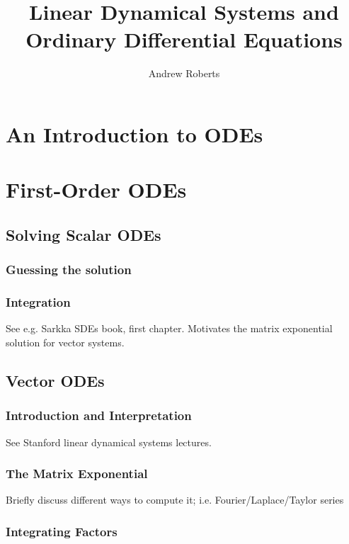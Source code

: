 \documentclass[12pt]{article}
\title{Linear Dynamical Systems and Ordinary Differential Equations}
\author{Andrew Roberts}
\begin{document}
\maketitle
\tableofcontents
\newpage

\section{An Introduction to ODEs}


\section{First-Order ODEs}

\subsection{Solving Scalar ODEs}

\subsubsection{Guessing the solution}

\subsubsection{Integration}
See e.g. Sarkka SDEs book, first chapter. Motivates the matrix exponential solution for vector systems. 

\subsection{Vector ODEs}

\subsubsection{Introduction and Interpretation}
See Stanford linear dynamical systems lectures. 

\subsubsection{The Matrix Exponential}
Briefly discuss different ways to compute it; i.e. Fourier/Laplace/Taylor series

\subsubsection{Integrating Factors}
\end{document}
